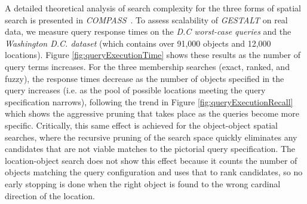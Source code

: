 A detailed theoretical analysis of search complexity for the three forms of spatial search is presented in \emph{COMPASS}~\cite{Osul2023}.
To assess scalability of \emph{GESTALT} on real data, we measure query response times on the \textit{D.C worst-case queries} and the \textit{Washington D.C. dataset} (which contains over 91,000 objects and 12,000 locations).
Figure \ref{fig:queryExecutionTime} shows these results as the number of query terms increases. 
For the three membership searches (exact, ranked, and fuzzy), the response times decrease as the number of objects specified in the query increases (i.e. as the pool of possible locations meeting the query specification narrows), following the trend in Figure \ref{fig:queryExecutionRecall} which shows the aggressive pruning that takes place as the queries become more specific.
Critically, this same effect is achieved for the object-object spatial searches, where the recursive pruning of the search space quickly eliminates any candidates that are not viable matches to the pictorial query specification.
The location-object search does not show this effect because it counts the number of objects matching the query configuration and uses that to rank candidates, so no early stopping is done when the right object is found to the wrong cardinal direction of the location. %









